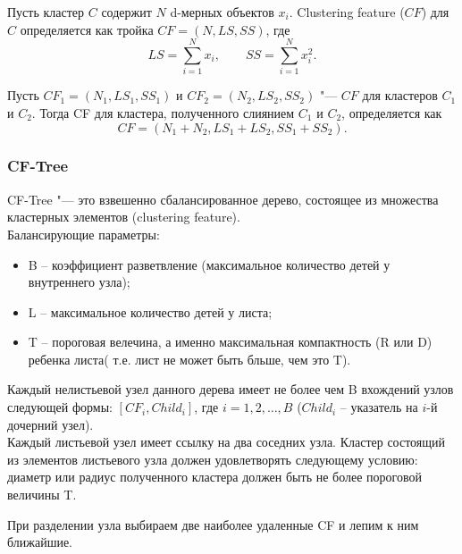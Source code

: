 \begin{Def}
 Пусть кластер $C$ содержит $N$ d-мерных объектов $x_i$. Clustering feature ($CF$) для $C$ определяется как тройка $CF = (N,LS,SS)$, где
 \[
 LS =  \sum\limits_{i=1}^{N} x_i, \qquad SS = \sum\limits_{i=1}^{N} x_i^2.
 \]
\end{Def}

\begin{Ut}
Пусть $CF_1 = (N_1, LS_1, SS_1)$ и $CF_2 = (N_2, LS_2, SS_2)$ "--- $CF$ для кластеров $C_1$ и $C_2$. Тогда CF для кластера, полученного слиянием $C_1$ и $C_2$, определяется как
\[
CF = (N_1 + N_2, LS_1 + LS_2, SS_1 + SS_2).
\]
\end{Ut}

\subsubsection{CF-Tree}
\begin{Def}
CF-Tree "--- это взвешенно сбалансированное дерево, состоящее из множества кластерных элементов (clustering feature). \\
Балансирующие параметры:
\begin{itemize}
\item B – коэффициент разветвление (максимальное количество детей у внутреннего узла);
\item L – максимальное количество детей у листа;
\item T – пороговая велечина, а именно максимальная компактность (R или D) ребенка листа( т.е. лист не может быть бльше, чем это T).
\end{itemize}
Каждый нелистьевой узел данного дерева имеет не более чем B вхождений узлов следующей формы: $[CF_i, Child_i]$, где $i = 1, 2, \dots, B$ ($Child_i$ – указатель на $i$-й дочерний узел).\\
Каждый листьевой узел имеет ссылку на два соседних узла. Кластер состоящий из элементов листьевого узла должен удовлетворять следующему условию: диаметр или радиус полученного кластера должен быть не более пороговой величины T.
\end{Def}

\begin{Zam}
При разделении узла выбираем две наиболее удаленные CF и лепим к ним ближайшие.
\end{Zam}

